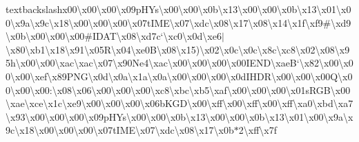 textbackslash{}x00\textbackslash{}x00\textbackslash{}x00\textbackslash{}x09p\+H\+Ys\textbackslash{}x00\textbackslash{}x00\textbackslash{}x0b\textbackslash{}x13\textbackslash{}x00\textbackslash{}x00\textbackslash{}x0b\textbackslash{}x13\textbackslash{}x01\textbackslash{}x00\textbackslash{}x9a\textbackslash{}x9c\textbackslash{}x18\textbackslash{}x00\textbackslash{}x00\textbackslash{}x00\textbackslash{}x07t\+I\+M\+E\textbackslash{}x07\textbackslash{}xdc\textbackslash{}x08\textbackslash{}x17\textbackslash{}x08\textbackslash{}x14\textbackslash{}x1f\textbackslash{}xf9\#\textbackslash{}xd9\textbackslash{}x0b\textbackslash{}x00\textbackslash{}x00\textbackslash{}x00\#\+I\+D\+A\+T\textbackslash{}x08\textbackslash{}xd7c`\textbackslash{}xc0\textbackslash{}x0d\textbackslash{}xe6$\vert$\textbackslash{}x80\textbackslash{}xb1\textbackslash{}x18\textbackslash{}x91\textbackslash{}x05\+R\textbackslash{}x04\textbackslash{}xe0\+B\textbackslash{}x08\textbackslash{}x15)\textbackslash{}x02\textbackslash{}x0c\textbackslash{}x0c\textbackslash{}x8c\textbackslash{}xc8\textbackslash{}x02\textbackslash{}x08\textbackslash{}x95h\textbackslash{}x00\textbackslash{}x00\textbackslash{}xac\textbackslash{}xac\textbackslash{}x07\textbackslash{}x90\+Ne4\textbackslash{}xac\textbackslash{}x00\textbackslash{}x00\textbackslash{}x00\textbackslash{}x00\+I\+E\+N\+D\textbackslash{}xae\+B`\textbackslash{}x82\textbackslash{}x00\textbackslash{}x00\textbackslash{}x00\textbackslash{}xef\textbackslash{}x89\+P\+N\+G\textbackslash{}x0d\textbackslash{}x0a\textbackslash{}x1a\textbackslash{}x0a\textbackslash{}x00\textbackslash{}x00\textbackslash{}x00\textbackslash{}x0d\+I\+H\+D\+R\textbackslash{}x00\textbackslash{}x00\textbackslash{}x00\+Q\textbackslash{}x00\textbackslash{}x00\textbackslash{}x00\+:\textbackslash{}x08\textbackslash{}x06\textbackslash{}x00\textbackslash{}x00\textbackslash{}x00\textbackslash{}xc8\textbackslash{}xbc\textbackslash{}xb5\textbackslash{}xaf\textbackslash{}x00\textbackslash{}x00\textbackslash{}x00\textbackslash{}x01s\+R\+G\+B\textbackslash{}x00\textbackslash{}xae\textbackslash{}xce\textbackslash{}x1c\textbackslash{}xe9\textbackslash{}x00\textbackslash{}x00\textbackslash{}x00\textbackslash{}x06b\+K\+G\+D\textbackslash{}x00\textbackslash{}xff\textbackslash{}x00\textbackslash{}xff\textbackslash{}x00\textbackslash{}xff\textbackslash{}xa0\textbackslash{}xbd\textbackslash{}xa7\textbackslash{}x93\textbackslash{}x00\textbackslash{}x00\textbackslash{}x00\textbackslash{}x09p\+H\+Ys\textbackslash{}x00\textbackslash{}x00\textbackslash{}x0b\textbackslash{}x13\textbackslash{}x00\textbackslash{}x00\textbackslash{}x0b\textbackslash{}x13\textbackslash{}x01\textbackslash{}x00\textbackslash{}x9a\textbackslash{}x9c\textbackslash{}x18\textbackslash{}x00\textbackslash{}x00\textbackslash{}x00\textbackslash{}x07t\+I\+M\+E\textbackslash{}x07\textbackslash{}xdc\textbackslash{}x08\textbackslash{}x17\textbackslash{}x0b$\ast$2\textbackslash{}xff\textbackslash{}x7f 